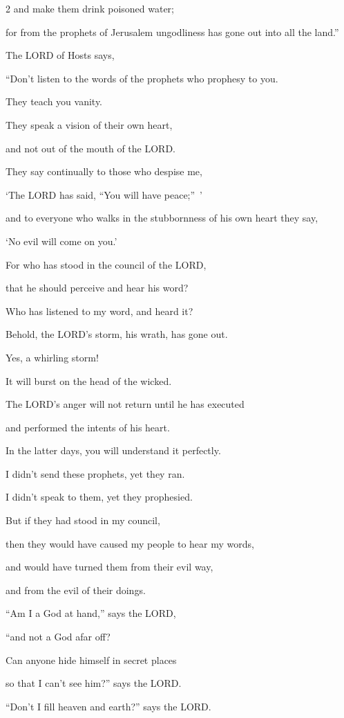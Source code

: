 \begin{multicols}{2}
and make them drink poisoned water;

for from the prophets of Jerusalem ungodliness has gone out into all the land.”


\myverse{}The LORD of Hosts says,

“Don’t listen to the words of the prophets who prophesy to you.

They teach you vanity.

They speak a vision of their own heart,

and not out of the mouth of the LORD.


\myverse{}They say continually to those who despise me,

‘The LORD has said, “You will have peace;” ’

and to everyone who walks in the stubbornness of his own heart they say,

‘No evil will come on you.’


\myverse{}For who has stood in the council of the LORD,

that he should perceive and hear his word?

Who has listened to my word, and heard it?


\myverse{}Behold, the LORD’s storm, his wrath, has gone out.

Yes, a whirling storm!

It will burst on the head of the wicked.


\myverse{}The LORD’s anger will not return until he has executed

and performed the intents of his heart.

In the latter days, you will understand it perfectly.


\myverse{}I didn’t send these prophets, yet they ran.

I didn’t speak to them, yet they prophesied.


\myverse{}But if they had stood in my council,

then they would have caused my people to hear my words,

and would have turned them from their evil way,

and from the evil of their doings.

\vspace{\baselineskip}

\myverse{}“Am I a God at hand,” says the LORD,

“and not a God afar off?


\myverse{}Can anyone hide himself in secret places

so that I can’t see him?” says the LORD.

“Don’t I fill heaven and earth?” says the LORD.
\end{multicols}

